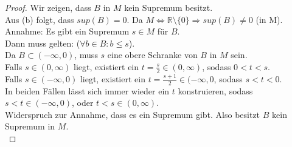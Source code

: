 \documentclass[12pt, letterpaper]{article}
\begin{document}
\begin{proof}

Wir zeigen, dass $B$ in $M$ kein Supremum besitzt.\\

\noindent Aus (b) folgt, dass $sup(B) = 0$. Da $M \Leftrightarrow \mathbb{R} \setminus \{0\} \Rightarrow sup(B) \neq 0$ (in M).\\

\noindent Annahme: Es gibt ein Supremum $s \in M$ für $B$.\\

\noindent Dann muss gelten: ($\forall b \in B: b \leq s$).\\

\noindent Da $B \subset (-\infty, 0)$, muss $s$ eine obere Schranke von $B$ in $M$ sein.\\

\noindent Falls $s \in (0, \infty)$ liegt, existiert ein $t = \frac{s}{2} \in (0, \infty)$, sodass $0 < t < s$.\\

\noindent Falls $s \in (-\infty, 0)$ liegt, existiert ein $t = \frac{s+1}{2} \in (-\infty, 0$, sodass $s < t < 0$. \\

\noindent In beiden Fällen lässt sich immer wieder ein $t$ konstruieren, sodass $s < t \in (-\infty, 0)$, oder $t < s \in (0, \infty)$.\\

\noindent Widerspruch zur Annahme, dass es ein Supremum gibt. Also besitzt $B$ kein Supremum in $M$.\\

\end{proof}
\end{document}
